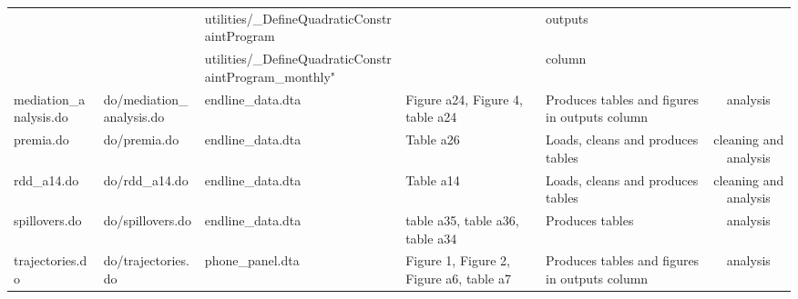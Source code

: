 \documentclass{article}
\begin{document}
\begin{landscape}
\begin{table}[h!]
{\begin{tabular}{lllL{5cm}C{3cm}c}
      &   & utilities/\_DefineQuadraticConstraintProgram &   & outputs   &  \\
      &   & utilities/\_DefineQuadraticConstraintProgram\_monthly" &   &column &  \\
    mediation\_analysis.do & do/mediation\_analysis.do & endline\_data.dta & Figure a24, Figure 4, table a24 & Produces tables and figures in outputs column & analysis \\
    premia.do & do/premia.do & endline\_data.dta & Table a26 & Loads, cleans and produces tables & cleaning and analysis \\
    rdd\_a14.do & do/rdd\_a14.do & endline\_data.dta & Table a14 & Loads, cleans and produces tables & cleaning and analysis \\
    spillovers.do & do/spillovers.do & endline\_data.dta & table a35, table a36, table a34 & Produces tables & analysis \\
    trajectories.do & do/trajectories.do & phone\_panel.dta & Figure 1, Figure 2, Figure a6, table a7 & Produces tables and figures in outputs column & analysis \\
    \hline
    \hline
    \end{tabular}}
  \label{tab:D2 table 3}
\end{table}

\end{landscape}
\end{document}
